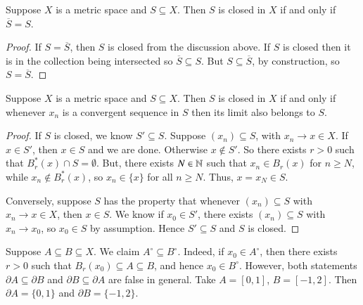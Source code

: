 \begin{proposition}
    Suppose $X$ is a metric space and $S \subseteq X$. Then $S$ is closed in $X$ if and only if $\overline{S} = S$.
\end{proposition}
\begin{proof}
    If $S = \overline{S}$, then $S$ is closed from the discussion above. If $S$ is closed then it is in the collection being intersected so $\overline{S} \subseteq S$. But $S \subseteq \overline{S}$, by construction, so $S = \overline{S}$.
\end{proof}


\begin{proposition}
    Suppose $X$ is a metric space and $S \subseteq X$. Then $S$ is closed in $X$ if and only if whenever $x_n$ is a convergent sequence in $S$ then its limit also belongs to $S$.
\end{proposition}
\begin{proof}
    If $S$ is closed, we know $S' \subseteq S$. Suppose $(x_n) \subseteq S$, with $x_n\rightarrow x \in X$. If $x \in S'$, then $x \in S$ and we are done. Otherwise $x \notin S'$. So there exists $r > 0$ such that $B_r^*(x) \cap S = \emptyset$. But, there exists $N \in \mathbb N$ such that $x_n \in B_r(x)$ for $n \geq N$, while $x_n \notin B_r^*(x)$, so $x_n \in \{x\}$ for all $n \geq N$. Thus, $x = x_N \in S$.

    Conversely, suppose $S$ has the property that whenever $(x_n) \subseteq S$ with $x_n \rightarrow x \in X$, then $x \in S$. We know if $x_0 \in S'$, there exists $(x_n) \subseteq S$ with $x_n\rightarrow x_0$, so $x_0 \in S$ by assumption. Hence $S' \subseteq S$ and $S$ is closed.
\end{proof}


\begin{example}
    Suppose $A \subseteq B \subseteq X$. We claim $A^{\circ}\subseteq B^{\circ}$. Indeed, if $x_0 \in A^{\circ}$, then there exists $r > 0$ such that $B_r(x_0) \subseteq A \subseteq B$, and hence $x_0 \in B^{\circ}$. However, both statements $\partial A \subseteq \partial B$ and $\partial B \subseteq \partial A$ are false in general. Take $A = [0,1]$, $B = [-1,2]$. Then $\partial A = \{0,1\}$ and $\partial B = \{-1,2\}$.
\end{example}

